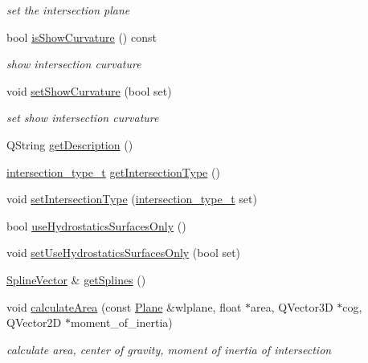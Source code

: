 \begin{DoxyCompactItemize}
\begin{DoxyCompactList}\small\item\em set the intersection plane \end{DoxyCompactList}\item 
bool \hyperlink{classShipCAD_1_1Intersection_a03df44a32b35481bf362af342f8b1aef}{is\+Show\+Curvature} () const 
\begin{DoxyCompactList}\small\item\em show intersection curvature \end{DoxyCompactList}\item 
void \hyperlink{classShipCAD_1_1Intersection_a492009095b78e7ce52c62e17eab38469}{set\+Show\+Curvature} (bool set)
\begin{DoxyCompactList}\small\item\em set show intersection curvature \end{DoxyCompactList}\item 
Q\+String \hyperlink{classShipCAD_1_1Intersection_ab0434113cfd34c8a3ab11f75976dbf5b}{get\+Description} ()
\item 
\hyperlink{namespaceShipCAD_aa56834b730aafdf2786ddc9a60a046fd}{intersection\+\_\+type\+\_\+t} \hyperlink{classShipCAD_1_1Intersection_a1b93db56e5877226b30871754bba9838}{get\+Intersection\+Type} ()
\item 
void \hyperlink{classShipCAD_1_1Intersection_af7b14b73d2fa77157fe7a46fce5490dd}{set\+Intersection\+Type} (\hyperlink{namespaceShipCAD_aa56834b730aafdf2786ddc9a60a046fd}{intersection\+\_\+type\+\_\+t} set)
\item 
bool \hyperlink{classShipCAD_1_1Intersection_a5ac5f3018d8b95b57ab40ccafe782bf4}{use\+Hydrostatics\+Surfaces\+Only} ()
\item 
void \hyperlink{classShipCAD_1_1Intersection_a7dccd8a9562004bb88edd94588395600}{set\+Use\+Hydrostatics\+Surfaces\+Only} (bool set)
\item 
\hyperlink{namespaceShipCAD_a053b941b2c87049bb9380428d4d5a056}{Spline\+Vector} \& \hyperlink{classShipCAD_1_1Intersection_a0092acbb149bb6a5c2e1f9a4b300c2da}{get\+Splines} ()
\item 
void \hyperlink{classShipCAD_1_1Intersection_a9e5c13aed9e318f7a5edf02214cfc6f9}{calculate\+Area} (const \hyperlink{classShipCAD_1_1Plane}{Plane} \&wlplane, float $\ast$area, Q\+Vector3D $\ast$cog, Q\+Vector2D $\ast$moment\+\_\+of\+\_\+inertia)
\begin{DoxyCompactList}\small\item\em calculate area, center of gravity, moment of inertia of intersection \end{DoxyCompactList}\item 

\end{DoxyCompactItemize}
